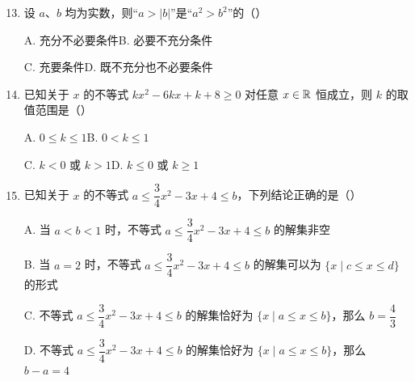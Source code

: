 \documentclass[a4paper,11pt]{article}
\begin{document}
\begin{enumerate}
\setcounter{enumi}{12}

\item 设 $a$、$b$ 均为实数，则“$a>|b|$”是“$a^2>b^2$”的\mbox{（\quad）}

\keepwithprev
A. 充分不必要条件\qquad B. 必要不充分条件

C. 充要条件\qquad\qquad D. 既不充分也不必要条件


\item 已知关于 $x$ 的不等式 $kx^2-6kx+k+8\geqslant0$ 对任意 $x\in\mathbb{R}$ 恒成立，则 $k$ 的取值范围是\mbox{（\quad）}

\keepwithprev
A. $0\leqslant k\leqslant1$\qquad B. $0<k\leqslant1$

C. $k<0$ 或 $k>1$\qquad D. $k\leqslant0$ 或 $k\geqslant1$


\ifanswer
\solbegin
{}
\solend
\fi

\item 已知关于 $x$ 的不等式 $a\leqslant\dfrac34x^2-3x+4\leqslant b$，下列结论正确的是\mbox{（\quad）}

\keepwithprev
A. 当 $a<b<1$ 时，不等式 $a\leqslant\dfrac34x^2-3x+4\leqslant b$ 的解集非空

B. 当 $a=2$ 时，不等式 $a\leqslant\dfrac34x^2-3x+4\leqslant b$ 的解集可以为 $\{x\mid c\leqslant x\leqslant d\}$ 的形式

C. 不等式 $a\leqslant\dfrac34x^2-3x+4\leqslant b$ 的解集恰好为 $\{x\mid a\leqslant x\leqslant b\}$，那么 $b=\dfrac43$

D. 不等式 $a\leqslant\dfrac34x^2-3x+4\leqslant b$ 的解集恰好为 $\{x\mid a\leqslant x\leqslant b\}$，那么 $b-a=4$



\end{enumerate}
\end{document}
